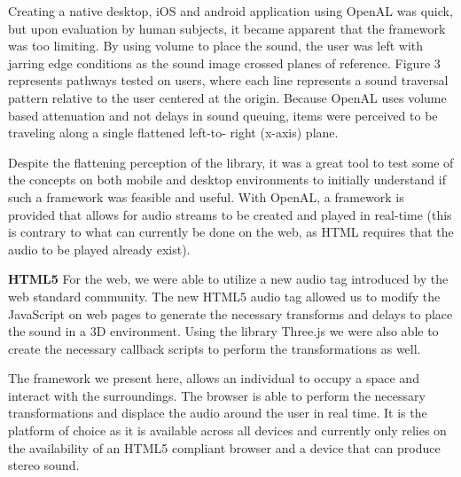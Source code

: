 Creating a native desktop, iOS and android application using OpenAL was quick,
but upon evaluation by  human subjects, it became apparent that the framework
was too limiting.  By using volume to place the sound, the user was left with
jarring edge conditions as the sound image crossed planes of reference.
Figure 3 represents pathways tested on users, where each line
represents a sound traversal pattern relative to the user centered at the
origin. Because OpenAL uses volume based attenuation and not delays in sound
queuing, items were perceived to be traveling along a single flattened left-to-
right (x-axis) plane.

Despite the flattening perception of the library, it was a great tool to test
some of the concepts on both mobile and desktop environments to initially
understand if such a framework was feasible and useful.  With OpenAL, a
framework is provided that allows for audio streams to be created and played in
real-time (this is contrary to what can currently be done on the web, as HTML
requires that the audio to be played already exist).

\textbf{HTML5} For the web, we were able to utilize a new audio tag introduced
by the web standard community.  The new HTML5 audio tag allowed us to modify the
JavaScript on web pages to generate the necessary transforms and delays to
place the sound in a 3D environment.  Using the library Three.js we were also
able to create the necessary callback scripts to perform the transformations as
well.

The framework we present here, allows an individual to occupy a space and
interact with the surroundings.  The browser is able to perform the necessary
transformations and displace the audio around the user in real time. It is the
platform of choice as it is available across all devices and currently only
relies on the availability of an HTML5 compliant browser and a device that
can produce stereo sound.
